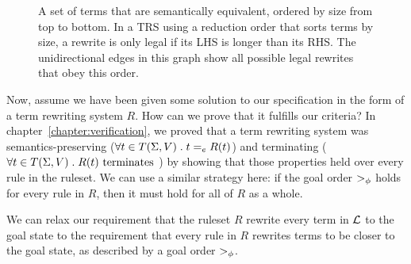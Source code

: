 \begin{figure}
\label{fig:orderedgraph}
\caption{A set of terms that are semantically equivalent, ordered by size from top to bottom. In a TRS using a reduction order that sorts terms by size, a rewrite is only legal if its LHS is longer than its RHS. The unidirectional edges in this graph show all possible legal rewrites that obey this order.}
\end{figure}

Now, assume we have been given some solution to our specification in the form of a term rewriting system $R$. How can we prove that it fulfills our criteria? In chapter~\ref{chapter:verification}, we proved that a term rewriting system was semantics-preserving ($\forall t \in T(\Sigma,V) \;.\; t =_e R(t)$) and terminating ($\forall t \in T(\Sigma,V) \;.\; R(t) \textrm{ terminates }$) by showing that those properties held over every rule in the ruleset. We can use a similar strategy here: if the goal order $>_{\phi}$ holds for every rule in $R$, then it must hold for all of $R$ as a whole.

\begin{assumption}
We can relax our requirement that the ruleset $R$ rewrite every term in $\mathcal{L}$ to the goal state to the requirement that every rule in $R$ rewrites terms to be closer to the goal state, as described by a goal order $>_{\phi}$.
\end{assumption}

